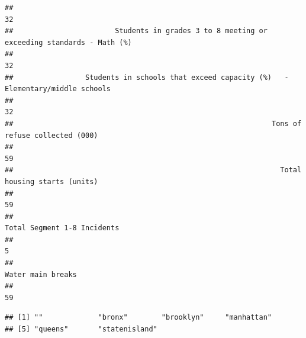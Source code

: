 \documentclass[]{article}
\newenvironment{Shaded}{\begin{snugshade}}{\end{snugshade}}
\newcommand{\CommentTok}[1]{\textcolor[rgb]{0.56,0.35,0.01}{\textit{#1}}}
\newcommand{\DataTypeTok}[1]{\textcolor[rgb]{0.13,0.29,0.53}{#1}}
\newcommand{\DecValTok}[1]{\textcolor[rgb]{0.00,0.00,0.81}{#1}}
\newcommand{\KeywordTok}[1]{\textcolor[rgb]{0.13,0.29,0.53}{\textbf{#1}}}
\newcommand{\NormalTok}[1]{#1}
\newcommand{\OperatorTok}[1]{\textcolor[rgb]{0.81,0.36,0.00}{\textbf{#1}}}
\newcommand{\OtherTok}[1]{\textcolor[rgb]{0.56,0.35,0.01}{#1}}
\newcommand{\StringTok}[1]{\textcolor[rgb]{0.31,0.60,0.02}{#1}}
\begin{document}
\begin{verbatim}
##                                                                                         32 
##                        Students in grades 3 to 8 meeting or exceeding standards - Math (%) 
##                                                                                         32 
##                 Students in schools that exceed capacity (%)   - Elementary/middle schools 
##                                                                                         32 
##                                                             Tons of refuse collected (000) 
##                                                                                         59 
##                                                               Total housing starts (units) 
##                                                                                         59 
##                                                                Total Segment 1-8 Incidents 
##                                                                                          5 
##                                                                          Water main breaks 
##                                                                                         59
\end{verbatim}

\begin{Shaded}
\end{Shaded}

\begin{verbatim}
## [1] ""             "bronx"        "brooklyn"     "manhattan"   
## [5] "queens"       "statenisland"
\end{verbatim}

\begin{Shaded}
\end{Shaded}
\end{document}
